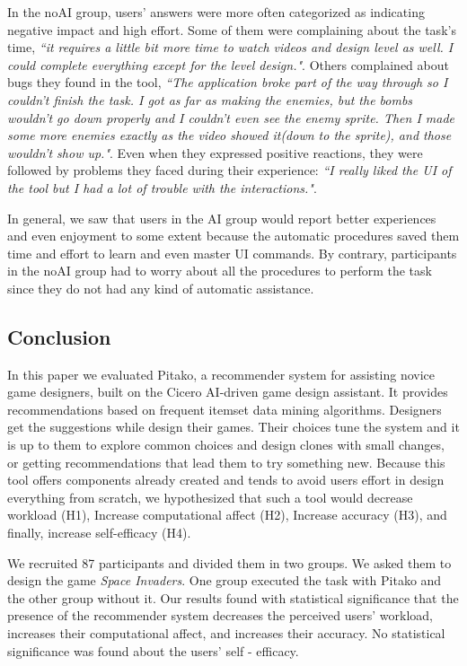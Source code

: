 \documentclass[letterpaper]{article} %
\begin{document}
In the noAI group, users' answers were more often categorized as indicating negative impact and high effort. Some of them were complaining about the task's time, \textit{``it requires a little bit more time to watch videos and design level as well. I could complete everything except for the level design."}. Others complained about bugs they found in the tool, \textit{``The application broke part of the way through so I couldn't finish the task. I got as far as making the enemies, but the bombs wouldn't go down properly and I couldn't even see the enemy sprite. Then I made some more enemies exactly as the video showed it(down to the sprite), and those wouldn't show up."}. Even when they expressed positive reactions, they were followed by problems they faced during their experience: \textit{``I really liked the UI of the tool but I had a lot of trouble with the interactions."}.

In general, we saw that users in the AI group would report better experiences and even enjoyment to some extent because the automatic procedures saved them time and effort to learn and even master UI commands. By contrary, participants in the noAI group had to worry about all the procedures to perform the task since they do not had any kind of automatic assistance. %

\subsection{Conclusion}
In this paper we evaluated Pitako, a recommender system for assisting novice game designers, built on the Cicero AI-driven game design assistant. It provides recommendations based on frequent itemset data mining algorithms. Designers get the suggestions while design their games. Their choices tune the system and it is up to them to explore common choices and design clones with small changes, or getting recommendations that lead them to try something new.
Because this tool offers components already created and tends to avoid users effort in design everything from scratch, we hypothesized that such a tool would decrease workload (H1), Increase computational affect (H2), Increase accuracy (H3), and finally, increase self-efficacy (H4).

We recruited 87 participants and divided them in two groups. We asked them to design the game \textit{Space Invaders}. One group executed the task with Pitako and the other group without it.
Our results found with statistical significance that the presence of the recommender system decreases the perceived users' workload, increases their computational affect, and increases their accuracy. No statistical significance was found about the users' self - efficacy.
\end{document}
